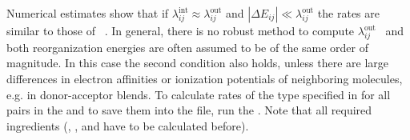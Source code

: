 Numerical estimates show that if  $\lambda_{ij}^\text{int} \approx 
\lambda_{ij}^\text{out}$ and $|\Delta E_{ij}| \ll \lambda_{ij}^\text{out}$ the 
rates are similar to those of ~. In general, there is no robust 
method to compute $\lambda_{ij}^\text{out}$~\cite{hoffman_reorganization_1996} 
and  both reorganization energies are often assumed to be of the same order of 
magnitude. In this case the second condition also holds, unless there are large 
differences in electron affinities or ionization potentials of neighboring 
molecules, e.g. in donor-acceptor blends.
\vskip 0.4cm
To calculate rates of the type specified in \xmloptions for all pairs in the 
 and to save them into the \sqlstate 
file, run the  \calculator. Note that all required ingredients 
(, 
, and 
 have to be calculated before).
